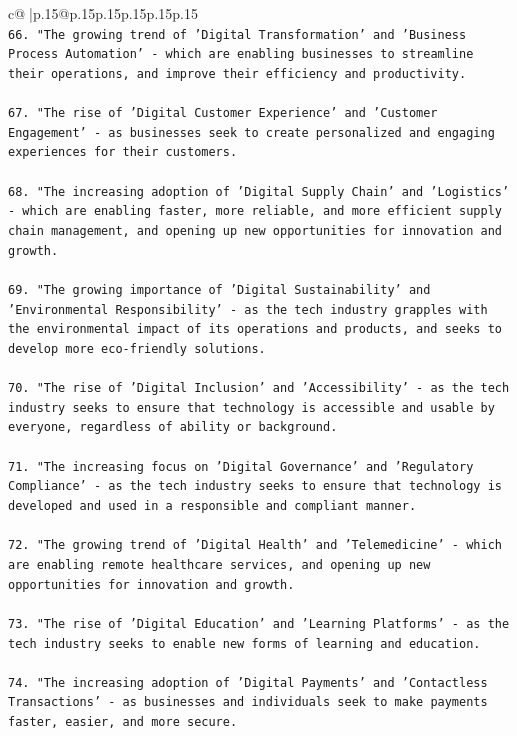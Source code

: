 \documentclass{article}
\begin{document}
{\begin{supertabular}{c@{$\;$}|p{.15\linewidth}@{}p{.15\linewidth}p{.15\linewidth}p{.15\linewidth}p{.15\linewidth}p{.15\linewidth}}
{{{\\ 
\texttt{66. "The growing trend of 'Digital Transformation' and 'Business Process Automation' {-} which are enabling businesses to streamline their operations, and improve their efficiency and productivity.} \\
\\ 
\texttt{67. "The rise of 'Digital Customer Experience' and 'Customer Engagement' {-} as businesses seek to create personalized and engaging experiences for their customers.} \\
\\ 
\texttt{68. "The increasing adoption of 'Digital Supply Chain' and 'Logistics' {-} which are enabling faster, more reliable, and more efficient supply chain management, and opening up new opportunities for innovation and growth.} \\
\\ 
\texttt{69. "The growing importance of 'Digital Sustainability' and 'Environmental Responsibility' {-} as the tech industry grapples with the environmental impact of its operations and products, and seeks to develop more eco{-}friendly solutions.} \\
\\ 
\texttt{70. "The rise of 'Digital Inclusion' and 'Accessibility' {-} as the tech industry seeks to ensure that technology is accessible and usable by everyone, regardless of ability or background.} \\
\\ 
\texttt{71. "The increasing focus on 'Digital Governance' and 'Regulatory Compliance' {-} as the tech industry seeks to ensure that technology is developed and used in a responsible and compliant manner.} \\
\\ 
\texttt{72. "The growing trend of 'Digital Health' and 'Telemedicine' {-} which are enabling remote healthcare services, and opening up new opportunities for innovation and growth.} \\
\\ 
\texttt{73. "The rise of 'Digital Education' and 'Learning Platforms' {-} as the tech industry seeks to enable new forms of learning and education.} \\
\\ 
\texttt{74. "The increasing adoption of 'Digital Payments' and 'Contactless Transactions' {-} as businesses and individuals seek to make payments faster, easier, and more secure.} \\
\\ 
}}}
\end{supertabular}}
\end{document}
